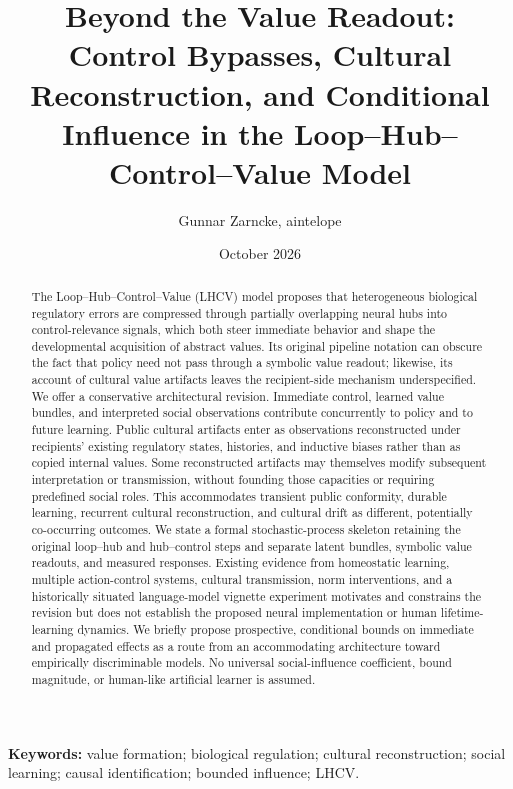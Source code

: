 \documentclass[11pt,a4paper]{article}
\title{Beyond the Value Readout:\\Control Bypasses, Cultural Reconstruction, and Conditional Influence in the Loop--Hub--Control--Value Model}
\author{Gunnar Zarncke, aintelope}
\date{October 2026}
\begin{document}
\maketitle
\begin{abstract}
The Loop--Hub--Control--Value (LHCV) model proposes that heterogeneous biological regulatory errors are compressed through partially overlapping neural hubs into control-relevance signals, which both steer immediate behavior and shape the developmental acquisition of abstract values. Its original pipeline notation can obscure the fact that policy need not pass through a symbolic value readout; likewise, its account of cultural value artifacts leaves the recipient-side mechanism underspecified. We offer a conservative architectural revision. Immediate control, learned value bundles, and interpreted social observations contribute concurrently to policy and to future learning. Public cultural artifacts enter as observations reconstructed under recipients' existing regulatory states, histories, and inductive biases rather than as copied internal values. Some reconstructed artifacts may themselves modify subsequent interpretation or transmission, without founding those capacities or requiring predefined social roles. This accommodates transient public conformity, durable learning, recurrent cultural reconstruction, and cultural drift as different, potentially co-occurring outcomes. We state a formal stochastic-process skeleton retaining the original loop--hub and hub--control steps and separate latent bundles, symbolic value readouts, and measured responses. Existing evidence from homeostatic learning, multiple action-control systems, cultural transmission, norm interventions, and a historically situated language-model vignette experiment motivates and constrains the revision but does not establish the proposed neural implementation or human lifetime-learning dynamics. We briefly propose prospective, conditional bounds on immediate and propagated effects as a route from an accommodating architecture toward empirically discriminable models. No universal social-influence coefficient, bound magnitude, or human-like artificial learner is assumed.
\end{abstract}

\noindent\textbf{Keywords:} value formation; biological regulation; cultural reconstruction; social learning; causal identification; bounded influence; LHCV.
\end{document}
